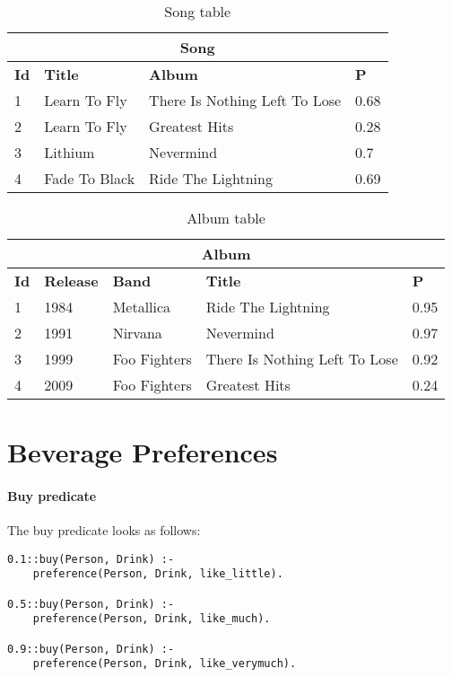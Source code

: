 \documentclass{article}
\begin{document}
\begin{table}[!p]
\centering

\begin{tabular}{llll}
\multicolumn{4}{c}{\textbf{Song}}                                         \\ \hline
\textbf{Id} & \textbf{Title} & \textbf{Album}                & \textbf{P} \\
1           & Learn To Fly   & There Is Nothing Left To Lose & 0.68       \\
2           & Learn To Fly   & Greatest Hits                 & 0.28       \\
3           & Lithium        & Nevermind                     & 0.7        \\
4           & Fade To Black  & Ride The Lightning                              & 0.69       \\ \hline
\end{tabular}
\caption{Song table}
\label{song}
\end{table}
\begin{table}[!p]
\centering


\begin{tabular}{lllll}
\multicolumn{5}{c}{\textbf{Album}}                                                          \\ \hline
\textbf{Id} & \textbf{Release} & \textbf{Band} & \textbf{Title}                & \textbf{P} \\
1           & 1984             & Metallica     & Ride The Lightning            & 0.95       \\
2           & 1991             & Nirvana       & Nevermind                     & 0.97       \\
3           & 1999             & Foo Fighters  & There Is Nothing Left To Lose & 0.92       \\
4           & 2009             & Foo Fighters  & Greatest Hits                 & 0.24       \\ \hline
\end{tabular}
\caption{Album table}
\label{album}
\end{table}




\section{Beverage Preferences}
\paragraph{Buy predicate}
The buy predicate looks as follows: 
\begin{verbatim}
0.1::buy(Person, Drink) :-
	preference(Person, Drink, like_little).

0.5::buy(Person, Drink) :-
	preference(Person, Drink, like_much).

0.9::buy(Person, Drink) :-
	preference(Person, Drink, like_verymuch).
\end{verbatim}
\end{document}
